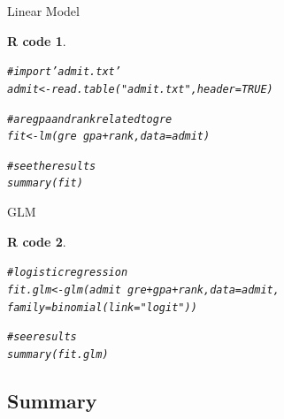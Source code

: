 \documentclass[11pt]{beamer}\usepackage[]{graphicx}\usepackage[]{color}
\makeatletter
\newcommand{\hlnum}[1]{\textcolor[rgb]{0.063,0.58,0.627}{#1}}%
\newcommand{\hlstr}[1]{\textcolor[rgb]{0.063,0.58,0.627}{#1}}%
\newcommand{\hlcom}[1]{\textcolor[rgb]{0.588,0.588,0.588}{#1}}%
\newcommand{\hlopt}[1]{\textcolor[rgb]{0.196,0.196,0.196}{#1}}%
\newcommand{\hlstd}[1]{\textcolor[rgb]{0.196,0.196,0.196}{#1}}%
\newcommand{\hlkwb}[1]{\textcolor[rgb]{0.627,0,0.314}{#1}}%
\newcommand{\hlkwc}[1]{\textcolor[rgb]{0,0.631,0.314}{#1}}%
\newcommand{\hlkwd}[1]{\textcolor[rgb]{0.78,0.227,0.412}{#1}}%
\newenvironment{kframe}{%
 \def\at@end@of@kframe{}%
 \ifinner\ifhmode%
  \def\at@end@of@kframe{\end{minipage}}%
  \begin{minipage}{\columnwidth}%
 \fi\fi%
 \def\FrameCommand##1{\hskip\@totalleftmargin \hskip-\fboxsep
 \colorbox{shadecolor}{##1}\hskip-\fboxsep
     \hskip-\linewidth \hskip-\@totalleftmargin \hskip\columnwidth}%
 \MakeFramed {\advance\hsize-\width
   \@totalleftmargin\z@ \linewidth\hsize
   \@setminipage}}%
 {\par\unskip\endMakeFramed%
 \at@end@of@kframe}
\newenvironment{knitrout}{}{} %
\newtheorem{rcode}{R code}[section]
\makeatother
\begin{document}
\begin{frame}[fragile]{Linear Model}

\begin{knitrout}
\color{fgcolor}\begin{kframe}
\begin{rcode}\label{unnamed-chunk-41}\begin{alltt}
\hlcom{# import 'admit.txt'}
\hlstd{admit} \hlkwb{<-} \hlkwd{read.table}\hlstd{(}\hlstr{"admit.txt"}\hlstd{,} \hlkwc{header} \hlstd{=} \hlnum{TRUE}\hlstd{)}

\hlcom{# are gpa and rank related to gre}
\hlstd{fit} \hlkwb{<-} \hlkwd{lm}\hlstd{(gre} \hlopt{~} \hlstd{gpa}\hlopt{+}\hlstd{rank,} \hlkwc{data} \hlstd{= admit)}

\hlcom{# see the results}
\hlkwd{summary}\hlstd{(fit)}
\end{alltt}
\end{rcode}\end{kframe}
\end{knitrout}

\end{frame}


\begin{frame}[fragile]{GLM}

\begin{knitrout}
\color{fgcolor}\begin{kframe}
\begin{rcode}\label{unnamed-chunk-42}\begin{alltt}
\hlcom{# logistic regression}
\hlstd{fit.glm} \hlkwb{<-} \hlkwd{glm}\hlstd{(admit} \hlopt{~} \hlstd{gre}\hlopt{+}\hlstd{gpa}\hlopt{+}\hlstd{rank,} \hlkwc{data} \hlstd{= admit,}
           \hlkwc{family} \hlstd{=} \hlkwd{binomial}\hlstd{(}\hlkwc{link} \hlstd{=} \hlstr{"logit"}\hlstd{))}

\hlcom{# see results}
\hlkwd{summary}\hlstd{(fit.glm)}
\end{alltt}
\end{rcode}\end{kframe}
\end{knitrout}

\end{frame}




\subsection{Summary}
\end{document}
